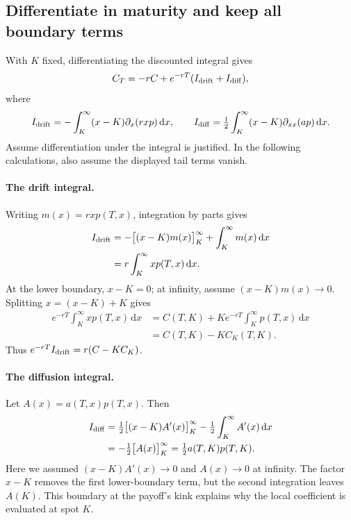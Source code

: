 \documentclass[10pt]{article}
\newcommand{\dd}{\,\mathrm d}\newcommand{\Pp}{\mathbb P}\newcommand{\Var}{\operatorname{Var}}\newcommand{\Cov}{\operatorname{Cov}}
\theoremstyle{definition}\newtheorem{definition}{Definition}[section]
\begin{document}
\subsection{Differentiate in maturity and keep all boundary terms}
With \(K\) fixed, differentiating the discounted integral gives
\[
C_T=-rC+e^{-rT}(I_{\rm drift}+I_{\rm diff}),
\]
where
\[
I_{\rm drift}=-\int_K^\infty(x-K)\partial_x(rxp)\dd x,
\qquad
I_{\rm diff}=\tfrac12\int_K^\infty(x-K)\partial_{xx}(ap)\dd x.
\]
Assume differentiation under the integral is justified. In the following
calculations, also assume the displayed tail terms vanish.

\paragraph{The drift integral.}
Writing \(m(x)=rxp(T,x)\), integration by parts gives
\begin{align*}
I_{\rm drift}
&=-\big[(x-K)m(x)\big]_K^\infty+\int_K^\infty m(x)\dd x\\
&=r\int_K^\infty xp(T,x)\dd x.
\end{align*}
At the lower boundary, \(x-K=0\); at infinity, assume
\((x-K)m(x)\to0\). Splitting \(x=(x-K)+K\) gives
\begin{align*}
e^{-rT}\int_K^\infty xp(T,x)\dd x
&=C(T,K)+Ke^{-rT}\int_K^\infty p(T,x)\dd x\\
&=C(T,K)-KC_K(T,K).
\end{align*}
Thus \(e^{-rT}I_{\rm drift}=r(C-KC_K)\).

\paragraph{The diffusion integral.}
Let \(A(x)=a(T,x)p(T,x)\). Then
\begin{align*}
I_{\rm diff}
&=\tfrac12\big[(x-K)A'(x)\big]_K^\infty
  -\tfrac12\int_K^\infty A'(x)\dd x\\
&=-\tfrac12\big[A(x)\big]_K^\infty
=\tfrac12a(T,K)p(T,K).
\end{align*}
Here we assumed \((x-K)A'(x)\to0\) and \(A(x)\to0\) at infinity.
The factor \(x-K\) removes the first lower-boundary term, but the second
integration leaves \(A(K)\). This boundary at the payoff's kink explains
why the local coefficient is evaluated at spot \(K\).
\end{document}
